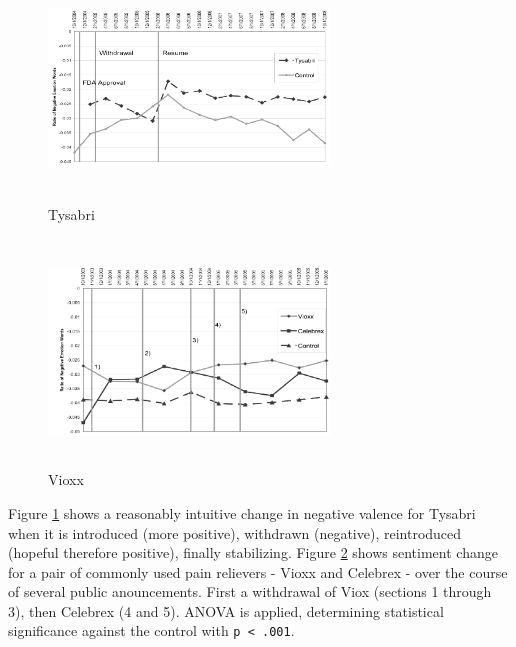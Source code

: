 \documentclass[twoside,11pt]{article}
\begin{document}
\hspace{-1cm}\begin{minipage}{.5\textwidth}
  \begin{figure}[H]
    \caption{Tysabri}
    \label{fig:tysabri}
    \includegraphics[width=7.5cm, height=6cm]{Figure-3-Tysabri.png}
  \end{figure}
\end{minipage}%
\hspace{.25cm}\begin{minipage}{.5\textwidth}
  \begin{figure}[H]
    \caption{Vioxx}
    \label{fig:vioxx}
    \includegraphics[width=7.5cm, height=6cm]{Figure-4-Vioxx.png}
  \end{figure}
\end{minipage}

Figure \ref{fig:tysabri} shows a reasonably intuitive change in negative valence for Tysabri when it is introduced (more positive), withdrawn (negative), reintroduced (hopeful therefore positive), finally stabilizing. Figure \ref{fig:vioxx} shows sentiment change for a pair of commonly used pain relievers - Vioxx and Celebrex - over the course of several public anouncements. First a withdrawal of Viox (sections 1 through 3), then Celebrex (4 and 5). ANOVA is applied, determining statistical significance against the control with \verb|p < .001|.
\end{document}
